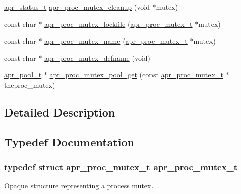 \begin{DoxyCompactItemize}
\item 
\hyperlink{group__apr__errno_gaf76ee4543247e9fb3f3546203e590a6c}{apr\+\_\+status\+\_\+t} \hyperlink{group__apr__proc__mutex_ga71ec4d283f58e893322f44116e6f8ea2}{apr\+\_\+proc\+\_\+mutex\+\_\+cleanup} (void $\ast$mutex)
\item 
const char $\ast$ \hyperlink{group__apr__proc__mutex_gad4dcc5ec2a5a6ede7be178e13f56377a}{apr\+\_\+proc\+\_\+mutex\+\_\+lockfile} (\hyperlink{group__apr__proc__mutex_ga0fae3a1ab686cd1f252c6062e4c97bd2}{apr\+\_\+proc\+\_\+mutex\+\_\+t} $\ast$mutex)
\item 
const char $\ast$ \hyperlink{group__apr__proc__mutex_ga3e5cf6b6fd0736502efd91312d50881c}{apr\+\_\+proc\+\_\+mutex\+\_\+name} (\hyperlink{group__apr__proc__mutex_ga0fae3a1ab686cd1f252c6062e4c97bd2}{apr\+\_\+proc\+\_\+mutex\+\_\+t} $\ast$mutex)
\item 
const char $\ast$ \hyperlink{group__apr__proc__mutex_gaf4425adc130f83784c552b6bc1563036}{apr\+\_\+proc\+\_\+mutex\+\_\+defname} (void)
\item 
\hyperlink{group__apr__pools_gaf137f28edcf9a086cd6bc36c20d7cdfb}{apr\+\_\+pool\+\_\+t} $\ast$ \hyperlink{group__apr__proc__mutex_ga9d7eda31ec4ad2183ddfcbff2f07daf9}{apr\+\_\+proc\+\_\+mutex\+\_\+pool\+\_\+get} (const \hyperlink{group__apr__proc__mutex_ga0fae3a1ab686cd1f252c6062e4c97bd2}{apr\+\_\+proc\+\_\+mutex\+\_\+t} $\ast$theproc\+\_\+mutex)
\end{DoxyCompactItemize}


\subsection{Detailed Description}


\subsection{Typedef Documentation}
\subsubsection[{\texorpdfstring{apr\+\_\+proc\+\_\+mutex\+\_\+t}{apr_proc_mutex_t}}]{\setlength{\rightskip}{0pt plus 5cm}typedef struct {\bf apr\+\_\+proc\+\_\+mutex\+\_\+t} {\bf apr\+\_\+proc\+\_\+mutex\+\_\+t}}\hypertarget{group__apr__proc__mutex_ga0fae3a1ab686cd1f252c6062e4c97bd2}{}\label{group__apr__proc__mutex_ga0fae3a1ab686cd1f252c6062e4c97bd2}
Opaque structure representing a process mutex. 

